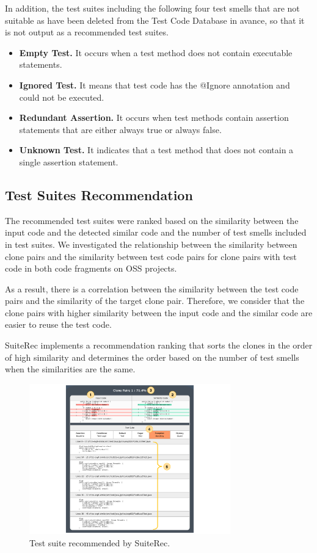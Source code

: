 \documentclass[conference]{IEEEtran}
\begin{document}
In addition, the test suites including the following four test smells that are not suitable as  have been deleted from the Test Code Database in avance, so that it is not output as a recommended test suites.

\begin{itemize}
\item \textbf{Empty Test. } It occurs when a test method does not contain executable statements.
\item \textbf{Ignored Test. } It means that test code has the @Ignore annotation and could not be executed.
\item \textbf{Redundant Assertion. } It occurs when test methods contain assertion statements that are either always true or always false. 
\item \textbf{Unknown Test. } It indicates that a test method that does not contain a single assertion statement.
\end{itemize}

\subsection{ Test Suites Recommendation}
The recommended test suites were ranked based on the similarity between the input code and the detected similar code and the number of test smells included in test suites. We investigated the relationship between the similarity between clone pairs and the similarity between test code pairs for clone pairs with test code in both code fragments on OSS projects.

As a result, there is a correlation between the similarity between the test code pairs and the similarity of the target clone pair. Therefore, we consider that the clone pairs with higher similarity between the input code and the similar code are easier to reuse the test code.

SuiteRec implements a recommendation ranking that sorts the clones in the order of high similarity and determines the order based on the number of test smells when the similarities are the same.


\begin{figure}[htbp]
\centerline{\includegraphics[width=8.7cm]{SuiteRec.pdf}}
\caption{Test suite recommended by SuiteRec.}
\label{fig}
\end{figure}
\end{document}
